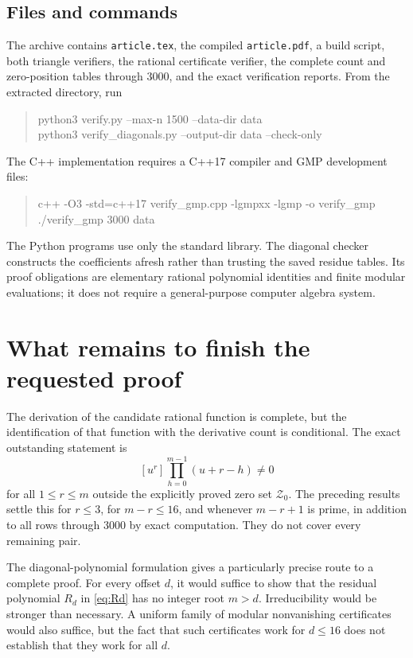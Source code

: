 \documentclass[11pt,a4paper]{article}
\numberwithin{equation}{section}
\theoremstyle{definition}
\theoremstyle{remark}
\newcommand{\coef}[2]{[#1^{#2}]}
\newcommand{\ZZ}{\mathcal Z}
\begin{document}
\subsection{Files and commands}
The archive contains \texttt{article.tex}, the compiled \texttt{article.pdf},
a build script, both triangle verifiers, the rational certificate verifier,
the complete count and zero-position tables through $3000$, and the exact
verification reports. From the extracted directory, run
\begin{quote}\ttfamily\small
python3 verify.py --max-n 1500 --data-dir data\\
python3 verify\_diagonals.py --output-dir data --check-only
\end{quote}
The C++ implementation requires a C++17 compiler and GMP development files:
\begin{quote}\ttfamily\small
c++ -O3 -std=c++17 verify\_gmp.cpp -lgmpxx -lgmp -o verify\_gmp\\
./verify\_gmp 3000 data
\end{quote}
The Python programs use only the standard library. The diagonal checker
constructs the coefficients afresh rather than trusting the saved residue
tables. Its proof obligations are elementary rational polynomial identities
and finite modular evaluations; it does not require a general-purpose
computer algebra system.

\section{What remains to finish the requested proof}

The derivation of the candidate rational function is complete, but the
identification of that function with the derivative count is conditional.
The exact outstanding statement is
\[
 \coef{u}{r}\prod_{h=0}^{m-1}(u+r-h)\ne0
\]
for all $1\le r\le m$ outside the explicitly proved zero set $\ZZ_0$.
The preceding results settle this for $r\le3$, for $m-r\le16$, and whenever
$m-r+1$ is prime, in addition to all rows through $3000$ by exact computation.
They do not cover every remaining pair.

The diagonal-polynomial formulation gives a particularly precise route to
a complete proof. For every offset $d$, it would suffice to show that the
residual polynomial $R_d$ in \eqref{eq:Rd} has no integer root $m>d$.
Irreducibility would be stronger than necessary. A uniform family of
modular nonvanishing certificates would also suffice, but the fact that
such certificates work for $d\le16$ does not establish that they work for
all $d$.
\end{document}
